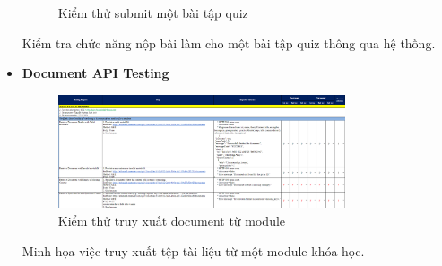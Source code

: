 \begin{itemize}
\begin{figure}[H]
        \caption{Kiểm thử submit một bài tập quiz}
    \end{figure}
    Kiểm tra chức năng nộp bài làm cho một bài tập quiz thông qua hệ thống.
    \item \textbf{Document API Testing}
    \begin{figure}[H]
        \centering
        \includegraphics[width=0.8\textwidth]{Images/test/test_DO.png}
        \caption{Kiểm thử truy xuất document từ module}
    \end{figure}
    Minh họa việc truy xuất tệp tài liệu từ một module khóa học.
\end{itemize}

